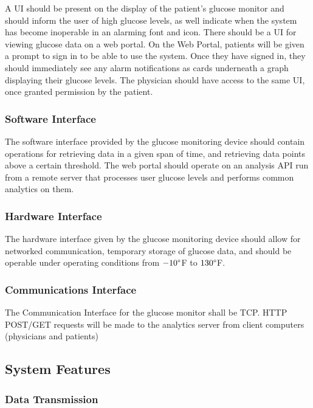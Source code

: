 \documentclass[12pt]{article}
\begin{document}
A UI should be present on the display of the patient's glucose monitor and should inform the user of high glucose levels,
as well indicate when the system has become inoperable in an alarming font and icon. There should be a UI for viewing
glucose data on a web portal. On the Web Portal, patients will be given a prompt to sign in to be able to use the
system. Once they have signed in, they should immediately see any alarm notifications as cards underneath a graph
displaying their glucose levels. The physician should have access to the same UI, once granted permission by the patient.

\subsubsection{Software Interface}

The software interface provided by the glucose monitoring device should contain operations for retrieving data in a given
span of time, and retrieving data points above a certain threshold. The web portal should operate on an analysis API run
from a remote server that processes user glucose levels and performs common analytics on them.

\subsubsection{Hardware Interface}

The hardware interface given by the glucose monitoring device should allow for networked communication, temporary
storage of glucose data, and should be operable under operating conditions from \(-10\degree\)F to \(130\degree\)F.

\subsubsection{Communications Interface}

The Communication Interface for the glucose monitor shall be TCP. HTTP POST/GET requests will be made to the analytics
server from client computers (physicians and patients)

\subsection{System Features}

\subsubsection{Data Transmission}
\end{document}
